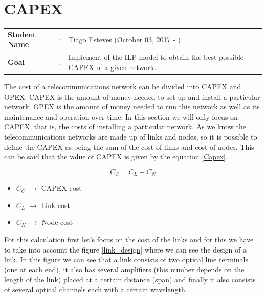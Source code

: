 \clearpage

\section{CAPEX}\label{ILP_CAPEX}
\begin{tcolorbox}	
\begin{tabular}{p{2.75cm} p{0.2cm} p{10.5cm}} 	
\textbf{Student Name}  &:& Tiago Esteves    (October 03, 2017 - )\\
\textbf{Goal}          &:& Implement of the ILP model to obtain the best possible CAPEX of a given network.
\end{tabular}
\end{tcolorbox}
\vspace{11pt}

The cost of a telecommunications network can be divided into CAPEX and OPEX.
CAPEX is the amount of money needed to set up and install a particular network.
OPEX is the amount of money needed to run this network as well as its maintenance and operation over time.
In this section we will only focus on CAPEX, that is, the costs of installing a particular network.
As we know the telecommunications networks are made up of links and nodes, so it is possible to define the CAPEX as being the sum of the cost of links and cost of nodes.
This can be said that the value of CAPEX is given by the equation \ref{Capex}.

\begin{equation}
C_C = C_L + C_N
\label{Capex}
\end{equation}


\begin{itemize}
\item{$C_C$				$\rightarrow$	CAPEX cost}
\item{$C_L$				$\rightarrow$	Link cost}
\item{$C_N$				$\rightarrow$	Node cost}
\end{itemize}


\vspace{11pt}
For this calculation first let's focus on the cost of the links and for this we have to take into account the figure \ref{link_design} where we can see the design of a link. In this figure we can see that a link consists of two optical line terminals (one at each end), it also has several amplifiers (this number depends on the length of the link) placed at a certain distance (span) and finally it also consists of several optical channels each with a certain wavelength.

